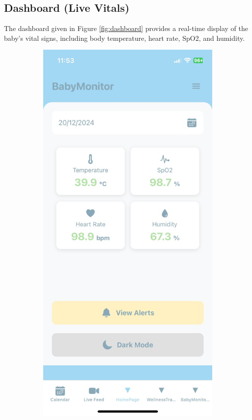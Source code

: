 \documentclass[12pt,a4paper]{report}
\begin{document}
\subsection{Dashboard (Live Vitals)}
The dashboard given in Figure \ref{fig:dashboard} provides a real-time display of the baby's vital signs, including body temperature, heart rate, SpO2, and humidity. 

\begin{figure}[H]
  \centering
  \begin{subfigure}[b]{0.22\textwidth}
    \centering
    \includegraphics[width=\textwidth]{./pic/dashboard.jpeg}

\end{subfigure}
\end{figure}
\end{document}
